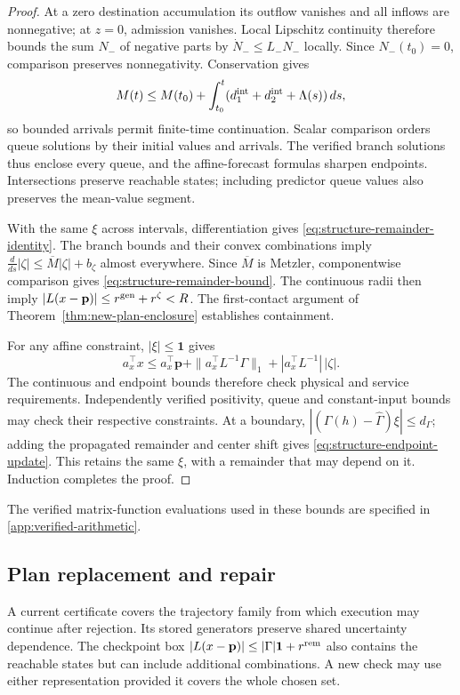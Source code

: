\documentclass[preprint,12pt]{elsarticle}
\theoremstyle{definition}
\theoremstyle{plain}
\theoremstyle{definition}
\theoremstyle{plain}
\newcommand{\appref}[1]{\ref{#1}}
\begin{document}
\begin{proof}
At a zero destination accumulation its outflow vanishes and all inflows
are nonnegative; at $z=0$, admission vanishes. Local Lipschitz continuity
therefore bounds the sum $N_-$ of negative parts by
$\dot N_-\le L_-N_-$ locally. Since $N_-(t_0)=0$, comparison
\cite{khalil2002nonlinear} preserves nonnegativity. Conservation gives
\[
M(t)\le M(t_0)+\int_{t_0}^t
(d_1^{\rm int}+d_2^{\rm int}+\Lambda(s))\,ds,
\]
so bounded arrivals permit finite-time continuation. Scalar comparison
orders queue solutions by their initial values and arrivals. The verified
branch solutions thus enclose every queue, and the affine-forecast
formulas sharpen endpoints. Intersections preserve reachable states;
including predictor queue values also preserves the mean-value segment.

With the same $\xi$ across intervals, differentiation gives
\eqref{eq:structure-remainder-identity}. The branch bounds and their
convex combinations imply
$\frac{d}{ds}|\zeta|\le\overline M|\zeta|+b_\zeta$ almost everywhere.
Since $\overline M$ is Metzler, componentwise comparison gives
\eqref{eq:structure-remainder-bound}. The continuous radii then imply
$|L(x-\mathbf p)|\le r^{\rm gen}+r^\zeta<R$. The first-contact argument
of Theorem~\ref{thm:new-plan-enclosure} establishes containment.

For any affine constraint, $|\xi|\le\mathbf1$ gives
\[
a_x^\top x\le a_x^\top\mathbf p+
\|a_x^\top L^{-1}\Gamma\|_1+
|a_x^\top L^{-1}|\,|\zeta|.
\]
The continuous and endpoint bounds therefore check physical and service
requirements. Independently verified positivity, queue and constant-input
bounds may check their respective constraints. At a boundary,
$|(\Gamma(h)-\widehat\Gamma)\xi|\le d_\Gamma$; adding the propagated
remainder and center shift gives \eqref{eq:structure-endpoint-update}.
This retains the same $\xi$, with a remainder that may depend on it.
Induction completes the proof.
\end{proof}

The verified matrix-function evaluations used in these bounds are
specified in \appref{app:verified-arithmetic}.

\subsection{Plan replacement and repair}
\label{sec:new-execution}

A current certificate covers the trajectory family from which execution
may continue after rejection. Its stored generators preserve shared
uncertainty dependence. The checkpoint box
$|L(x-\mathbf p)|\le|\Gamma|\mathbf1+r^{\rm rem}$ also contains the
reachable states but can include additional combinations. A new check
may use either representation provided it covers the whole chosen set.
\end{document}
